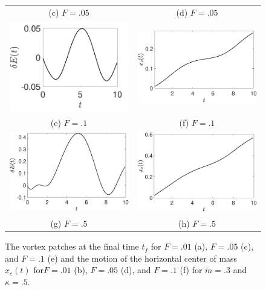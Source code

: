 \documentclass[a4paper,11pt]{article}
\begin{document}
\begin{figure}
\begin{tabular}{cc}
(c) $F=.05$ & (d) $F=.05$\\
 \includegraphics[width=.35\textwidth]{energy_wm_10_modu_pt3} & \includegraphics[width=.35\textwidth]{com_wm_10_modu_pt3}\\
(e) $F=.1$ & (f) $F=.1$\\
 \includegraphics[width=.35\textwidth]{energy_wm_50_modu_pt3} & \includegraphics[width=.35\textwidth]{com_wm_50_modu_pt3}\\
(g) $F=.5$ & (h) $F=.5$
\end{tabular}
\caption{The vortex patches at the final time $t_{f}$ for $F=.01$ (a), $F=.05$ (c), and $F=.1$ (e) and the motion of the horizontal center of mass $x_{c}(t)$ for$F=.01$ (b), $F=.05$ (d), and $F=.1$ (f) for $\tilde{m}=.3$ and $\kappa = .5$.}
\label{fig:lowsolvorticity}
\end{figure}

\end{document}
